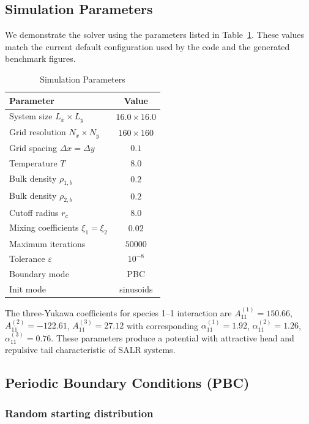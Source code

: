 \documentclass[conference]{IEEEtran}
\begin{document}
\subsection{Simulation Parameters}

We demonstrate the solver using the parameters listed in Table~\ref{tab:params}. These values match the current default configuration used by the code and the generated benchmark figures.

\begin{table}[htbp]
\caption{Simulation Parameters}
\begin{center}
\begin{tabular}{|l|c|}
\hline
\textbf{Parameter} & \textbf{Value} \\
\hline
System size $L_x \times L_y$ & $16.0 \times 16.0$ \\
Grid resolution $N_x \times N_y$ & $160 \times 160$ \\
Grid spacing $\Delta x = \Delta y$ & $0.1$ \\
Temperature $T$ & $8.0$ \\
Bulk density $\rho_{1,b}$ & $0.2$ \\
Bulk density $\rho_{2,b}$ & $0.2$ \\
Cutoff radius $r_c$ & $8.0$ \\
Mixing coefficients $\xi_1 = \xi_2$ & $0.02$ \\
Maximum iterations & $50000$ \\
Tolerance $\varepsilon$ & $10^{-8}$ \\
Boundary mode & PBC \\
Init mode & sinusoids \\
\hline
\end{tabular}
\label{tab:params}
\end{center}
\end{table}

The three-Yukawa coefficients for species 1--1 interaction are $A_{11}^{(1)} = 150.66$, $A_{11}^{(2)} = -122.61$, $A_{11}^{(3)} = 27.12$ with corresponding $\alpha_{11}^{(1)} = 1.92$, $\alpha_{11}^{(2)} = 1.26$, $\alpha_{11}^{(3)} = 0.76$. These parameters produce a potential with attractive head and repulsive tail characteristic of SALR systems.

\subsection{Periodic Boundary Conditions (PBC)}

\subsubsection{Random starting distribution}
\end{document}
